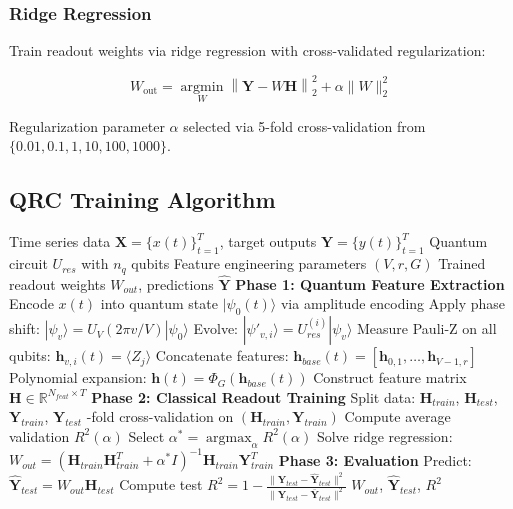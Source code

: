 \documentclass[conference]{IEEEtran}
\begin{document}
\subsubsection{Ridge Regression}
Train readout weights via ridge regression \cite{hoerl1970ridge} with cross-validated regularization:

\begin{equation}
W_{\text{out}} = \operatorname*{argmin}_{W} \left\| \mathbf{Y} - W \mathbf{H} \right\|_2^2 + \alpha \|W\|_2^2
\label{eq:ridge_regression}
\end{equation}

Regularization parameter $\alpha$ selected via 5-fold cross-validation from $\{0.01, 0.1, 1, 10, 100, 1000\}$.

\subsection{QRC Training Algorithm}

\begin{algorithm}[!htbp]
\caption{Quantum Reservoir Computing Training Pipeline}
\label{alg:qrc_training}
\begin{algorithmic}[1]
\Require Time series data $\mathbf{X} = \{x(t)\}_{t=1}^T$, target outputs $\mathbf{Y} = \{y(t)\}_{t=1}^T$
\Require Quantum circuit $U_{res}$ with $n_q$ qubits
\Require Feature engineering parameters $(V, r, G)$
\Ensure Trained readout weights $W_{out}$, predictions $\hat{\mathbf{Y}}$
\State \textbf{Phase 1: Quantum Feature Extraction}
\State Encode $x(t)$ into quantum state $|\psi_0(t)\rangle$ via amplitude encoding
 
\State Apply phase shift: $|\psi_v\rangle = U_V(2\pi v/V) |\psi_0\rangle$
 
\State Evolve: $|\psi'_{v,i}\rangle = U_{res}^{(i)} |\psi_v\rangle$
\State Measure Pauli-Z on all qubits: $\mathbf{h}_{v,i}(t) = \langle Z_j \rangle$
\EndFor
\EndFor
\State Concatenate features: $\mathbf{h}_{base}(t) = [\mathbf{h}_{0,1}, \ldots, \mathbf{h}_{V-1,r}]$
\State Polynomial expansion: $\mathbf{h}(t) = \Phi_G(\mathbf{h}_{base}(t))$ 
\EndFor
\State Construct feature matrix $\mathbf{H} \in \mathbb{R}^{N_{feat} \times T}$
\State \textbf{Phase 2: Classical Readout Training}
\State Split data: $\mathbf{H}_{train}$, $\mathbf{H}_{test}$, $\mathbf{Y}_{train}$, $\mathbf{Y}_{test}$
-fold cross-validation on $(\mathbf{H}_{train}, \mathbf{Y}_{train})$
\State Compute average validation $R^2(\alpha)$
\EndFor
\State Select $\alpha^* = \operatorname*{argmax}_\alpha R^2(\alpha)$
\State Solve ridge regression: $W_{out} = (\mathbf{H}_{train}\mathbf{H}_{train}^T + \alpha^* I)^{-1} \mathbf{H}_{train} \mathbf{Y}_{train}^T$
\State \textbf{Phase 3: Evaluation}
\State Predict: $\hat{\mathbf{Y}}_{test} = W_{out} \mathbf{H}_{test}$
\State Compute test $R^2 = 1 - \frac{\|\mathbf{Y}_{test} - \hat{\mathbf{Y}}_{test}\|^2}{\|\mathbf{Y}_{test} - \bar{\mathbf{Y}}_{test}\|^2}$
\State \Return $W_{out}$, $\hat{\mathbf{Y}}_{test}$, $R^2$
\end{algorithmic}
\end{algorithm}
\end{document}

